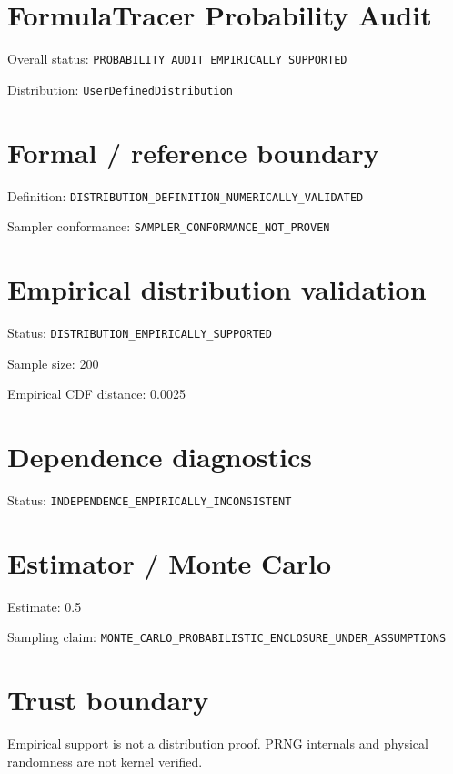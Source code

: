\documentclass{article}
\begin{document}
\section*{FormulaTracer Probability Audit}
\noindent Overall status: \texttt{PROBABILITY\_AUDIT\_EMPIRICALLY\_SUPPORTED}\par
\noindent Distribution: \texttt{UserDefinedDistribution}\par
\section*{Formal / reference boundary}
\noindent Definition: \texttt{DISTRIBUTION\_DEFINITION\_NUMERICALLY\_VALIDATED}\par
\noindent Sampler conformance: \texttt{SAMPLER\_CONFORMANCE\_NOT\_PROVEN}\par
\section*{Empirical distribution validation}
\noindent Status: \texttt{DISTRIBUTION\_EMPIRICALLY\_SUPPORTED}\par
\noindent Sample size: 200\par
\noindent Empirical CDF distance: 0.0025\par
\section*{Dependence diagnostics}
\noindent Status: \texttt{INDEPENDENCE\_EMPIRICALLY\_INCONSISTENT}\par
\section*{Estimator / Monte Carlo}
\noindent Estimate: 0.5\par
\noindent Sampling claim: \texttt{MONTE\_CARLO\_PROBABILISTIC\_ENCLOSURE\_UNDER\_ASSUMPTIONS}\par
\section*{Trust boundary}
Empirical support is not a distribution proof. PRNG internals and physical randomness are not kernel verified.
\end{document}
